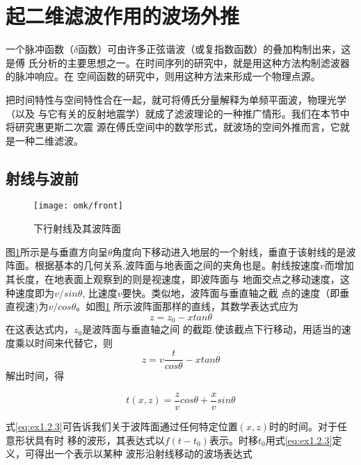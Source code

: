 \section{起二维滤波作用的波场外推}
\label{sec:1.2}

一个脉冲函数（$\delta$函数）可由许多正弦谐波（或复指数函数）的叠加构制出来，这是傅
氏分析的主要思想之一。在时间序列的研究中，就是用这种方法构制滤波器的脉冲响应。在
空间函数的研究中，则用这种方法来形成一个物理点源。

把时间特性与空间特性合在一起，就可将傅氏分量解释为单频平面波，物理光学（以及
与它有关的反射地震学）就成了滤波理论的一种推广情形。我们在本节中将研究惠更斯二次震
源在傅氏空间中的数学形式，就波场的空间外推而言，它就是一种二维滤波。

\subsection{射线与波前}
\label{sec:1.2.1}

\begin{figure}[H]
\centering
\texttt{[image: omk/front]}
\caption[front]{下行射线及其波阵面}
\label{fig:omk/front}
\end{figure}
  图\ref{fig:omk/front}所示是与垂直方向呈$\theta$角度向下移动进入地层的一个射线，垂直于该射线的是波
  阵面。根据基本的几何关系,波阵面与地表面之间的夹角也是。射线按速度$v$而增加其长度，在地表面上观察到的则是视速度，即波阵面与
  地面交点之移动速度，这种速度即为$v/sin\theta$,
  比速度$v$要快。类似地，波阵面与垂直轴之截
  点的速度（即垂直视速)为$v/cos\theta$。如图\ref{fig:omk/front}
  所示波阵面那样的直线，其数学表达式应为
  \begin{equation}
  z=z_{0}-xtan\theta
  \label{eq:ex1.2.1}
  \end{equation}
    在这表达式内，$z_{0}$是波阵面与垂直轴之间
    的截距.使该截点下行移动，用适当的速度乘以时间来代替它，则
  \begin{equation}
  z=v\frac{t}{cos\theta}-xtan\theta
  \label{eq:ex1.2.2}
  \end{equation}
    解出时间，得

  \begin{equation}
  t(x,z)=\frac{z}{v}cos\theta+\frac{x}{v}sin\theta
  \label{eq:ex1.2.3}
  \end{equation}

  式\ref{eq:ex1.2.3}可告诉我们关于波阵面通过任何特定位置$(x,z)$时的时间。对于任意形状具有时
  移的波形，其表达式以$f(t-t_{0})$表示。时移$t_{0}$用式\ref{eq:ex1.2.3}定义，可得出一个表示以某种
  波形沿射线移动的波场表达式

